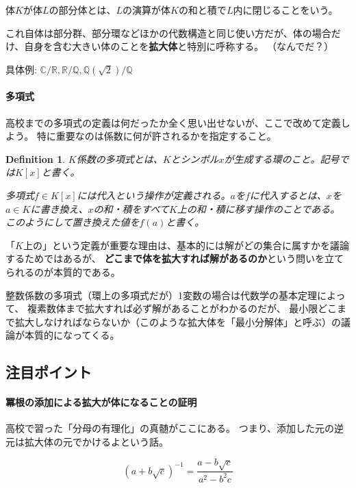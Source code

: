 \documentclass[uplatex]{jsarticle}
\newtheorem{definition}{Definition}
\begin{document}
体$K$が体$L$の部分体とは、$L$の演算が体$K$の和と積で$L$内に閉じることをいう。

これ自体は部分群、部分環などほかの代数構造と同じ使い方だが、体の場合だけ、自身を含む大きい体のことを\textbf{拡大体}と特別に呼称する。
（なんでだ？）

具体例: $\mathbb{C}/\mathbb{R}, \mathbb{R}/\mathbb{Q}, \mathbb{Q}(\sqrt{2})/\mathbb{Q}$

\paragraph*{多項式}

高校までの多項式の定義は何だったか全く思い出せないが、ここで改めて定義しよう。
特に重要なのは係数に何が許されるかを指定すること。

\begin{definition}
    $K$係数の多項式とは、$K$とシンボル$x$が生成する環のこと。記号では$K[x]$と書く。


    多項式$f \in K[x]$には代入という操作が定義される。$a$を$f$に代入するとは、$x$を$a \in K$に書き換え、$x$の和・積をすべて$K$上の和・積に移す操作のことである。
    このようにして置き換えた値を$f(a)$と書く。
\end{definition}

「$K$上の」という定義が重要な理由は、基本的には解がどの集合に属すかを議論するためではあるが、
\textbf{どこまで体を拡大すれば解があるのか}という問いを立てられるのが本質的である。

整数係数の多項式（環上の多項式だが）1変数の場合は代数学の基本定理によって、
複素数体まで拡大すれば必ず解があることがわかるのだが、
最小限どこまで拡大しなければならないか（このような拡大体を「最小分解体」と呼ぶ）の議論が本質的になってくる。

\subsection{注目ポイント}

\paragraph*{冪根の添加による拡大が体になることの証明} 高校で習った「分母の有理化」の真髄がここにある。
つまり、添加した元の逆元は拡大体の元でかけるよという話。

\begin{equation}
    (a + b \sqrt{c})^{-1} = \frac{a - b \sqrt{c}}{a^2 - b^2 c}
\end{equation}
\end{document}
